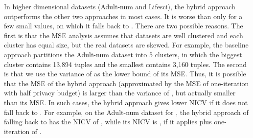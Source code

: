 In higher dimensional datasets (Adult-num and Lifesci), the hybrid approach outperforms the other two approaches in most cases. It is worse than \dpl only for a few small  values, on which it falls back to \eugkm. There are two possible reasons. The first is that the MSE analysis assumes that datasets are well clustered and each cluster has equal size, but the real datasets are skewed. For example, the baseline approach partitions the Adult-num dataset into 5 clusters, in which the biggest cluster contains 13,894 tuples and the smallest contains 3,160 tuples. The second is that we use the variance of \eugkm as the lower bound of its MSE. Thus, it is possible that the MSE of the hybrid approach (approximated by the MSE of one-iteration \dpl with half privacy budget) is larger than the variance of \eugkm, but actually smaller than its MSE. In such cases, the hybrid approach gives lower NICV if it does not fall back to \eugkm. For example, on the Adult-num dataset for , the hybrid approach of falling back to \eugkm has the NICV of , while its NICV is , if it applies \eugkm plus one-iteration of \dpl.



\begin{comment}
In this section we experimentally compare the two non-interactive algorithms UGkM and AUGkM, the hybrid approach, and the \dpl.  Figure \ref{fig:hybrid} reports the results.  The Hybrid approach always outperforms the existing non-interactive algorithms and interactive algorithms over all datasets.  The advantage of it is more significant in the two high dimensional datasets, Adult-num and Lifesci.  Observe that the Hybrid approach has same performance as the AUGkM in the S1 dataset.  The reason is that the two-phase hybrid approach cannot improve the AUGkM result.  So we use one-phase hybrid approach, that is running AUGkM only.

In addition, we can see that AUGkM generally outperforms UGkM in all datasets.  The difference is significant When  is very small.  They generally converge to close NICV values when  becomes large.  This seems to suggest that they are reaching the limit of what non-interactive methods can do.  Also, UGkM and AUGkM can never converge to the baseline, as the non-interactive methods have some inherent noises due to the partitioning.  On the other hand, the two non-interactive approaches is superior to the \dpl in the four low dimension datasets.  But \dpl outperformed them in two high dimension datasets, Adult-num and Lifesci.  Therefore, the limits of the non-interactive approaches and the strength of \dpl in high dimension datasets motive the hybrid approach.
\end{comment}

















